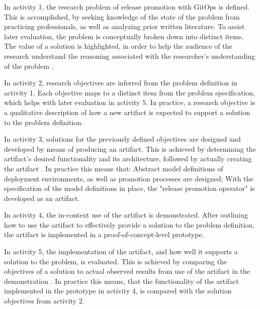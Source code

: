 \noindent
In activity 1,
the research problem of
release promotion with GitOps
is defined.
This is accomplished, by
seeking knowledge of the state of the problem
from practicing professionals,
as well as analyzing prior written literature.
To assist later evaluation,
the problem is conceptually broken down into distinct items.
The value of a solution is highlighted,
in order to help the audience of the research
understand the reasoning associated with the
researcher's understanding of the problem
\autocite{designScienceResearchMethodologyForInformationSystemsResearch}.
\bigskip

\noindent
In activity 2,
research objectives are inferred from the problem definition in activity 1.
Each objective maps to a distinct item from the problem specification,
which helps with later evaluation in activity 5.
In practice, a research objective is a qualitative description of
how a new artifact is expected to support a solution to the problem definition.
\bigskip


\noindent
In activity 3,
solutions for the previously defined objectives are designed and developed
by means of producing an artifact.
This is achieved by
determining the artifact's desired functionality and its architecture,
followed by actually creating the artifact
\autocite{designScienceResearchMethodologyForInformationSystemsResearch}.
In practice this means that:
Abstract model definitions of deployment environments, as well as
promotion processes are designed;
With the specification of the model definitions in place,
the "release promotion operator" is developed as an artifact.
\bigskip

\noindent
In activity 4,
the in-context use of the artifact is demonstrated.
After outlining how to use the artifact to effectively provide a solution to the problem definition,
the artifact is implemented in a proof-of-concept-level prototype.
\bigskip

\noindent
In activity 5,
the implementation of the artifact,
and how well it supports a solution to the problem,
is evaluated.
This is achieved by
comparing the objectives of a solution to actual observed results
from use of the artifact in the demonstration
\autocite{designScienceResearchMethodologyForInformationSystemsResearch}.
In practice this means, that
the functionality of the artifact implemented in the prototype in activity 4,
is compared with the solution objectives from activity 2.
\bigskip

